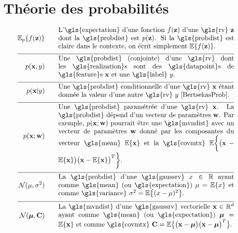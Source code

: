 \section*{Théorie des probabilités} 
\begin{align}
	\expect_{p} \{ f(\datapoint) \}  \quad\quad & \parbox{.75\textwidth}{L'\gls{expectation} d'une fonction $f(\datapoint)$ d'une \gls{rv} 
		$\datapoint$ dont la \gls{probdist} est $\prob{\datapoint}$. Si la \gls{probdist} est claire dans le contexte, 
		on écrit simplement $\expect \{ f(\datapoint) \}$. }  \nonumber \\[2mm] \hline \nonumber\\[-5mm]    
	\prob{\featurevec,\truelabel} \quad\quad & \parbox{.75\textwidth}{Une \gls{probdist} (conjointe) d'une \gls{rv} 
		dont les \gls{realization}s sont des \gls{datapoint}s de \gls{feature}s $\featurevec$ et une \gls{label} $\truelabel$.} \nonumber        \nonumber \\[2mm] \hline \nonumber\\[-5mm]        
	\prob{\featurevec|\truelabel} \quad\quad & \parbox{.75\textwidth}{Une \gls{probdist} conditionnelle d'une \gls{rv} 
		$\featurevec$ étant donnée la valeur d'une autre \gls{rv} $\truelabel$ \cite[Sec.\ 3.5]{BertsekasProb}. } \nonumber       \nonumber \\[2mm] \hline \nonumber\\[-5mm]           
	\prob{\featurevec;\weights} \quad\quad & \parbox{.75\textwidth}{Une \gls{probdist} paramétrée d'une \gls{rv} $\featurevec$. 
		La \gls{probdist} dépend d'un vecteur de paramètres $\weights$. Par exemple, $\prob{\featurevec;\weights}$ pourrait être une 
		\gls{mvndist} avec un vecteur de paramètres $\weights$ donné par les composantes du vecteur \gls{mean} $\expect \{ \featurevec \}$ 
		et la \gls{covmtx} $\expect \bigg \{ \big( \featurevec - \expect \{ \featurevec \}\big) \big( \featurevec - \expect \{ \featurevec \}\big)^{T}  \bigg\}$.} \nonumber           \nonumber \\[2mm] \hline \nonumber\\[-5mm]
	\mathcal{N}(\mu, \sigma^{2}) \quad\quad & \parbox{.75\textwidth}{La \gls{probdist} d'une 
		\gls{gaussrv} $\feature \in \mathbb{R}$ ayant comme \gls{mean} (ou \gls{expectation}) $\mu= \expect \{ \feature \}$ 
		et comme \gls{variance} $\sigma^{2} =   \expect \big\{  (  \feature - \mu )^2 \big\}$.} \nonumber    \nonumber \\[2mm] \hline \nonumber\\[-5mm]
	\mathcal{N}(\clustermean, \mathbf{C}) \quad\quad & \parbox{.75\textwidth}{La \gls{mvndist} d'une \gls{gaussrv} vectorielle 
		$\featurevec \in \mathbb{R}^{\featuredim}$ ayant comme \gls{mean} (ou \gls{expectation}) $\clustermean= \expect \{ \featurevec \}$ 
		et comme \gls{covmtx} $\mathbf{C} =  \expect \big\{ \big( \featurevec - \clustermean \big)\big( \featurevec - \clustermean \big)^{T} \big\}$.} \nonumber                                             
\end{align}






